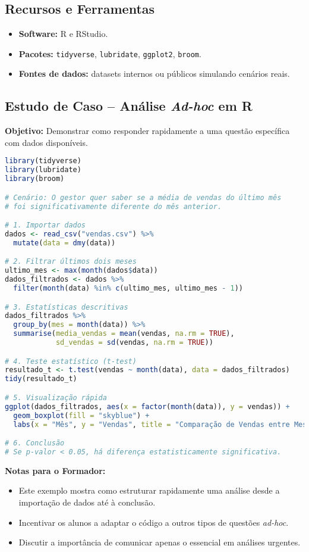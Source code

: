 \subsection{\textcolor{subsectionblue}{Recursos e Ferramentas}}
\begin{itemize}
  \item \textbf{Software:} R e RStudio.
  \item \textbf{Pacotes:} \texttt{tidyverse}, \texttt{lubridate}, \texttt{ggplot2}, \texttt{broom}.
  \item \textbf{Fontes de dados:} datasets internos ou públicos simulando cenários reais.
\end{itemize}

\subsection{\textcolor{subsectionblue}{Estudo de Caso – Análise \textit{Ad-hoc} em R}}
\textbf{Objetivo:} Demonstrar como responder rapidamente a uma questão específica com dados disponíveis.

\begin{lstlisting}[language=R]
library(tidyverse)
library(lubridate)
library(broom)

# Cenário: O gestor quer saber se a média de vendas do último mês
# foi significativamente diferente do mês anterior.

# 1. Importar dados
dados <- read_csv("vendas.csv") %>%
  mutate(data = dmy(data))

# 2. Filtrar últimos dois meses
ultimo_mes <- max(month(dados$data))
dados_filtrados <- dados %>%
  filter(month(data) %in% c(ultimo_mes, ultimo_mes - 1))

# 3. Estatísticas descritivas
dados_filtrados %>%
  group_by(mes = month(data)) %>%
  summarise(media_vendas = mean(vendas, na.rm = TRUE),
            sd_vendas = sd(vendas, na.rm = TRUE))

# 4. Teste estatístico (t-test)
resultado_t <- t.test(vendas ~ month(data), data = dados_filtrados)
tidy(resultado_t)

# 5. Visualização rápida
ggplot(dados_filtrados, aes(x = factor(month(data)), y = vendas)) +
  geom_boxplot(fill = "skyblue") +
  labs(x = "Mês", y = "Vendas", title = "Comparação de Vendas entre Meses")

# 6. Conclusão
# Se p-valor < 0.05, há diferença estatisticamente significativa.
\end{lstlisting}

\textbf{Notas para o Formador:}
\begin{itemize}
  \item Este exemplo mostra como estruturar rapidamente uma análise desde a importação de dados até à conclusão.
  \item Incentivar os alunos a adaptar o código a outros tipos de questões \textit{ad-hoc}.
  \item Discutir a importância de comunicar apenas o essencial em análises urgentes.
\end{itemize}
